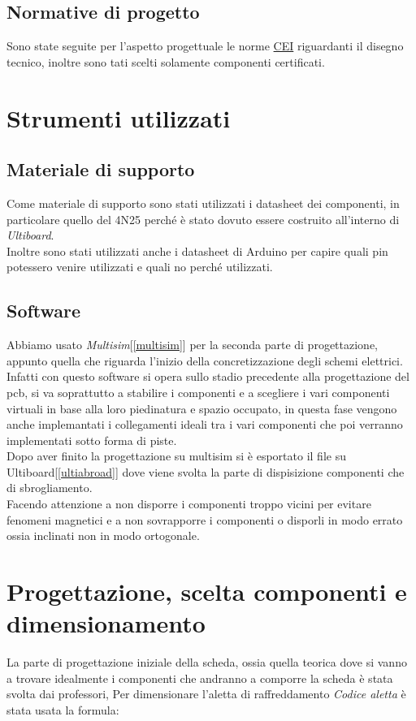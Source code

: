 \documentclass{article}
\begin{document}
\subsection{Normative di progetto}
Sono state seguite per l'aspetto progettuale le norme \href{https://my.ceinorme.it/home.html}{CEI} riguardanti il disegno tecnico, inoltre sono tati scelti solamente componenti certificati.
\section{Strumenti utilizzati}
\subsection{Materiale di supporto}
Come materiale di supporto sono stati utilizzati i datasheet dei componenti, in particolare quello del 4N25 perché è stato dovuto essere costruito all'interno di \textit{Ultiboard}.\\
Inoltre sono stati utilizzati anche i datasheet di Arduino per capire quali pin potessero venire utilizzati e quali no perché utilizzati.
\subsection{Software}
Abbiamo usato \textit{Multisim}[\ref{multisim}] per la seconda parte di progettazione, appunto quella che riguarda l'inizio della concretizzazione
degli schemi elettrici.\\
Infatti con questo software si opera sullo stadio precedente alla progettazione del pcb, si va soprattutto a stabilire i componenti e a scegliere i vari componenti virtuali
in base alla loro piedinatura e spazio occupato, in questa fase vengono anche implemantati i collegamenti ideali tra i vari componenti che poi verranno implementati sotto forma di piste.\\
Dopo aver finito la progettazione su multisim si è esportato il file su Ultiboard[\ref{ultiabroad}] dove viene svolta la parte di dispisizione componenti che di sbrogliamento.\\
Facendo attenzione a non disporre i componenti troppo vicini per evitare fenomeni magnetici e a non sovrapporre i componenti o disporli in modo errato ossia inclinati non in modo ortogonale.  
\section{Progettazione, scelta componenti e dimensionamento}
La parte di progettazione iniziale della scheda, ossia quella teorica dove si vanno a trovare idealmente i componenti che andranno a comporre la scheda è stata svolta dai professori,
Per dimensionare l'aletta di raffreddamento \textit{Codice aletta} è stata usata la formula:
\end{document}
